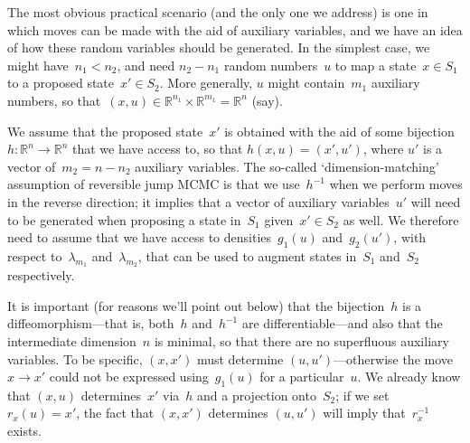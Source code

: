 \documentclass[11pt,a4paper]{article}
\newcommand\mb[1]{\mathbb{#1}}                   %
\theoremstyle{definition}
\begin{document}
The most obvious practical scenario (and the only one we address) is one in
which moves can be made with the aid of auxiliary variables, and we have an idea
of how these random variables should be generated. In the simplest case, we
might have~$n_1 < n_2$, and need $n_2-n_1$ random numbers~$u$ to map a state~$x
\in S_1$ to a proposed state~$x' \in S_2$. More generally, $u$ might
contain~$m_1$ auxiliary numbers, so that~$(x,u) \in \mb{R}^{n_1} \times
\mb{R}^{m_1} = \mb{R}^n$ (say).

We assume that the proposed state~$x'$ is obtained with the aid of some
bijection~$h\colon \mb{R}^n \to \mb{R}^n$ that we have access to, so that
$h(x,u) = (x',u')$, where $u'$ is a vector of~$m_2 = n-n_2$ auxiliary variables.
The so-called `dimension-matching' assumption of reversible jump MCMC is that we
use~$h^{-1}$ when we perform moves in the reverse direction; it implies that a
vector of auxiliary variables~$u'$ will need to be generated when proposing a
state in~$S_1$ given~$x' \in S_2$ as well. We therefore need to assume that we
have access to densities~$g_1(u)$ and~$g_2(u')$, with respect to~$\lambda_{m_1}$
and~$\lambda_{m_2}$, that can be used to augment states in~$S_1$ and~$S_2$
respectively.

It is important (for reasons we'll point out below) that the bijection~$h$ is a
diffeomorphism---that is, both~$h$ and~$h^{-1}$ are differentiable---and also
that the intermediate dimension~$n$ is minimal, so that there are no superfluous
auxiliary variables. To be specific, $(x,x')$ must determine
$(u,u')$---otherwise the move~$x \to x'$ could not be expressed using~$g_1(u)$
for a particular~$u$. We already know that $(x,u)$ determines~$x'$ via~$h$ and a
projection onto~$S_2$; if we set~$r_x(u) = x'$, the fact that $(x,x')$
determines $(u,u')$ will imply that~$r_x^{-1}$ exists.
\end{document}
